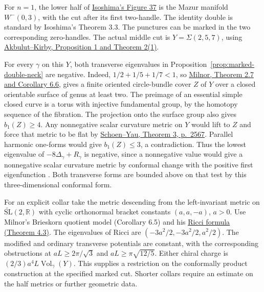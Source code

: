 \begin{example}\label{ex:mazur-spectral-seam}
For \(n=1\), the lower half of
\href{https://arxiv.org/pdf/2403.17356v2#page=35}{Isoshima's
Figure 37} is the Mazur manifold \(W^-(0,3)\), with the cut
after its first two-handle. The identity double is standard
by Isoshima's Theorem 3.3. The punctures can be marked in
the two corresponding zero-handles. The actual middle
cut is \(Y=\Sigma(2,5,7)\), using
\href{https://math.berkeley.edu/~kirby/papers/Akbulut%20and%20Kirby%20-%20Mazur%20manifolds%20-%20MR0544597.pdf}{Akbulut--Kirby,
Proposition 1 and Theorem 2(1)}.

For every \(\gamma\) on this \(Y\), both transverse
eigenvalues in Proposition~\ref{prop:marked-double-neck}
are negative. Indeed, \(1/2+1/5+1/7<1\), so
\href{https://webhomes.maths.ed.ac.uk/~v1ranick/papers/milnbries.pdf}{Milnor,
Theorem 2.7 and Corollary 6.6}, gives a finite oriented
circle-bundle cover \(Z\) of \(Y\) over a closed orientable
surface of genus at least two. The preimage of an essential
simple closed curve is a torus with injective fundamental
group, by the homotopy sequence of the fibration. The
projection onto the surface group also gives \(b_1(Z)\ge4\).
Any nonnegative scalar curvature metric on \(Y\) would lift
to \(Z\) and force that metric to be flat by
\href{https://archive.ymsc.tsinghua.edu.cn/pacm_download/59/11113-Shing-Tung_Yau_216.pdf}{Schoen--Yau,
Theorem 3, p.~2567}. Parallel harmonic one-forms would give
\(b_1(Z)\le3\), a contradiction. Thus the lowest eigenvalue
of \(-8\Delta_\gamma+R_\gamma\) is negative, since a
nonnegative value would give a nonnegative scalar curvature
metric by conformal change with the positive first
eigenfunction \cite[eq.~(1.1)]{LeeParker1987Yamabe}. Both
transverse forms are bounded above on that test by this
three-dimensional conformal form.

For an explicit collar take the metric descending from the
left-invariant metric on
\(\widetilde{\mathrm{SL}}(2,\mathbb R)\) with cyclic
orthonormal bracket constants \((a,a,-a)\), \(a>0\).
Use Milnor's Brieskorn quotient model (Corollary 6.5)
and his
\href{https://core.ac.uk/download/pdf/82428733.pdf}{Ricci
formula (Theorem 4.3)}. The eigenvalues of Ricci are
\((-3a^2/2,-3a^2/2,a^2/2)\). The modified and ordinary
transverse potentials are constant, with the corresponding
obstructions at \(aL\ge 2\pi/\sqrt3\) and
\(aL\ge\pi\sqrt{12/5}\). Either chiral charge is
\((2/3)a^4L\operatorname{Vol}_{\gamma}(Y)\).
This supplies a restriction on the conformally product
construction at the specified marked cut. Shorter collars
require an estimate on the half metrics or further geometric
data.
\end{example}
